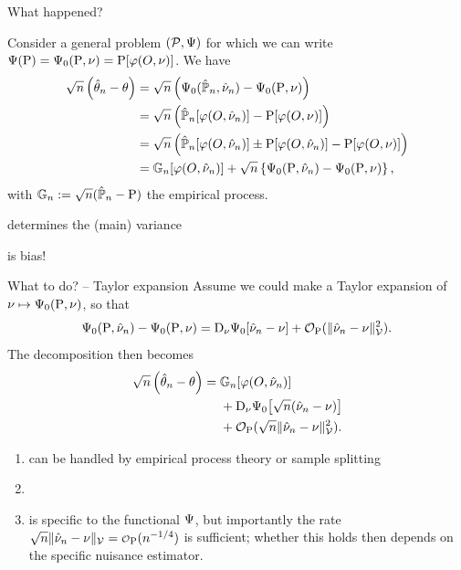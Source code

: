 \documentclass{beamer}\usepackage{listings}
\begin{document}
\begin{frame}[label={sec:org39dc8ed}]{What happened?}
\pause

Consider a general problem \((\mathcal{P}, \operatorname{\Psi})\) for which we can write \(\operatorname{\Psi}(\mathrm{{P}}) = \operatorname{\Psi}_0(\mathrm{{P}}, \nu) =
\mathrm{{P}}[\varphi(O, \nu)]\). \pause We have
\begin{align*}
  \sqrt{n}
  \left(
  \hat{\theta}_n - \theta
  \right)
  & =  \sqrt{n}
    \left(
    \TT_0(\empmeas,\hat{\nu}_n) - \TT_0(\P,\nu)
    \right) \\
  & =
    \sqrt{n}
    \left(
    \empmeas[\phi(O, \hat{\nu}_n)] -
    \P[\phi(O, \nu)]
    \right) \\
  & =
    \sqrt{n}
    \left(
    \empmeas[\phi(O, \hat{\nu}_n)] 
    \pm \P[\phi(O, \hat{\nu}_n)] %
    - \P[\phi(O, \nu)]
    \right)    \\
  & =
    \G{\phi(O, \hat{\nu}_n) } +
    \sqrt{n} 
    \left\{
    \TT_0(\P,  \hat{\nu}_n) - \TT_0(\P,  \nu)
    \right\},
\end{align*}
with $\mathbb{G}_n: = \sqrt{n}(\hat{\mathbb{P}}_n -\mathrm{{P}})$ the empirical process.

\vfill \pause

\begin{description}[<+->]
\item[{\(\G{\phi(O, \hat{\nu}_n) }\)}] determines the (main) variance
\item[{\(\TT_0(\P,  \hat{\nu}_n) - \TT_0(\P,  \nu)\)}] is bias!
\end{description}
\end{frame}

\begin{frame}[label={sec:orge50ca70}]{What to do?  -- Taylor expansion}
\pause
Assume we could make a Taylor expansion of $\nu \mapsto \operatorname{\Psi}_0(\mathrm{{P}}, \nu)$, so that
\begin{equation*}
  \operatorname{\Psi}_0(\mathrm{{P}},  \hat{\nu}_n) - \operatorname{\Psi}_0(\mathrm{{P}},  \nu)
  = \mathrm{D}_{\nu}{\operatorname{\Psi}_0}[\hat{\nu}_n - \nu] +
  \mathcal{O}_{\mathrm{{P}}}(\Vert \hat{\nu}_n - \nu \Vert_{\mathcal{V}}^2).
\end{equation*}
\pause The decomposition then becomes
\begin{align}
  \sqrt{n}
  \left(
  \hat{\theta}_n - \theta
  \right)
  = \; & {\mathbb{G}_{n}{\left[\varphi( O, \hat{\nu}_n)\right]}} \\
    & + \mathrm{D_{\nu}{\operatorname{\Psi}_0}}{ \left[
      \sqrt{n}(\hat{\nu}_n - \nu)
      \right]} \\
    &  +  \mathcal{O}_{\mathrm{{P}}}(\sqrt{n}\Vert \hat{\nu}_n - \nu \Vert_{\mathcal{V}}^2).
\end{align}
\pause
\begin{enumerate}[(1)]
\item can be handled by empirical process theory or sample splitting \pause
\item {} \pause
\item is specific to the functional $\operatorname{\Psi}$, but importantly the rate
  $\sqrt{n}\Vert \hat{\nu}_n - \nu \Vert_{\mathcal{V}} = \smallO_{\P}(n^{-1/4})$ is sufficient;
  whether this holds then depends on the specific nuisance estimator.
\end{enumerate}
\end{frame}
\end{document}
